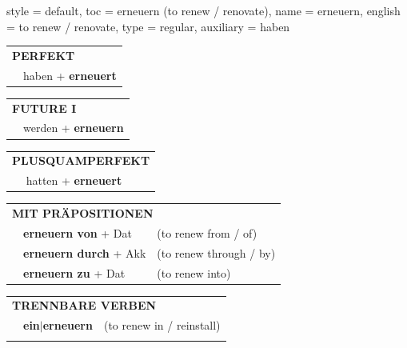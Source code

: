 \begin{verbentry}{
  style = {default},
  toc = {erneuern (to renew / renovate)},
  name = {erneuern},
  english = {to renew / renovate},
  type = {regular},
  auxiliary = {haben}
}
 \begin{tabular}{rl}
     \multicolumn{2}{l}{\textbf{PERFEKT}}\\
   & haben + \textbf{erneuert}\\
  \end{tabular}
\hfill
\begin{tabular}{rl}
    \multicolumn{2}{l}{\textbf{FUTURE I}}\\
   & werden + \textbf{erneuern}\\
  \end{tabular}
\hfill
\begin{tabular}{rl}
    \multicolumn{2}{l}{\textbf{PLUSQUAMPERFEKT}}\\
   & hatten + \textbf{erneuert}\\
  \end{tabular}

 \vspace{10pt}

\begin{tabular}{lll}
      \multicolumn{3}{l}{\textbf{MIT PRÄPOSITIONEN}}\\
& \textbf{erneuern von} + Dat & (to renew from / of)\\
& \textbf{erneuern durch} + Akk & (to renew through / by)\\
& \textbf{erneuern zu} + Dat & (to renew into)\\
\end{tabular}
  \hfill
\begin{tabular}{lll}
      \multicolumn{3}{l}{\textbf{TRENNBARE VERBEN}}\\
 & \textbf{ein$|$erneuern} & (to renew in / reinstall)\\
\vspace{20pt}
  \end{tabular}


\vspace{-5pt}
\end{verbentry}


